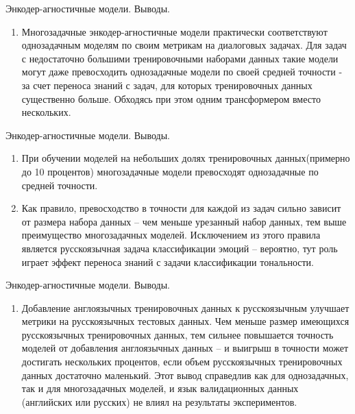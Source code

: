 \begin{frame}{Энкодер-агностичные модели. Выводы.}
\begin{enumerate}
\item Многозадачные энкодер-агностичные модели практически соответствуют однозадачным моделям по своим метрикам на диалоговых задачах. Для задач с недостаточно большими тренировочными наборами данных такие модели могут даже превосходить однозадачные модели по своей средней точности - за счет переноса знаний с задач, для которых тренировочных данных существенно больше. Обходясь при этом одним трансформером вместо нескольких.
\end{enumerate}
\end{frame}
\begin{frame}{Энкодер-агностичные модели. Выводы.}
\begin{enumerate}
\item При обучении моделей на небольших долях тренировочных данных(примерно до 10 процентов) многозадачные модели превосходят однозадачные по средней точности.
\item Как правило, превосходство в точности для каждой из задач сильно зависит от размера набора данных -- чем меньше урезанный набор данных, тем выше преимущество многозадачных моделей. Исключением из этого правила является русскоязычная задача классификации эмоций -- вероятно, тут роль играет эффект переноса знаний с задачи классификации тональности.
\end{enumerate}
\end{frame}
\begin{frame}{Энкодер-агностичные модели. Выводы.}
\begin{enumerate}
\item Добавление англоязычных тренировочных данных к русскоязычным улучшает метрики на русскоязычных тестовых данных. Чем меньше размер имеющихся русскоязычных тренировочных данных, тем сильнее повышается точность моделей от добавления англоязычных данных -- и выигрыш в точности может достигать нескольких процентов, если объем русскоязычных тренировочных данных достаточно маленький. Этот вывод справедлив как для однозадачных, так и для многозадачных моделей, и язык валидационных данных (английских или русских) не влиял на результаты экспериментов.
\end{enumerate}
\end{frame}


